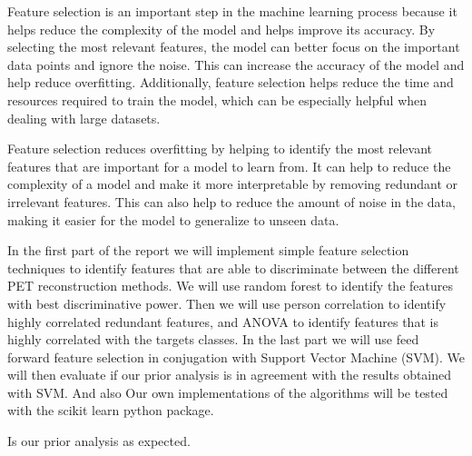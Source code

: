 Feature selection is an important step in the machine learning process because
it helps reduce the complexity of the model and helps improve its accuracy. By
selecting the most relevant features, the model can better focus on the
important data points and ignore the noise. This can increase the accuracy of
the model and help reduce overfitting. Additionally, feature selection helps
reduce the time and resources required to train the model, which can be
especially helpful when dealing with large datasets.

Feature selection reduces overfitting by helping to identify the most relevant
features that are important for a model to learn from. It can help to reduce
the complexity of a model and make it more interpretable by removing redundant
or irrelevant features. This can also help to reduce the amount of noise in the
data, making it easier for the model to generalize to unseen data.




In the first part of the report we will implement simple feature selection
techniques to identify features that are able to discriminate between the
different PET reconstruction methods. We will use random forest to identify the
features with best discriminative power. Then we will use person correlation to
identify highly correlated redundant features, and ANOVA to identify
features that is highly correlated with the targets classes. In the last part we will
use feed forward feature selection in conjugation with Support Vector Machine
(SVM). We will then evaluate if our prior analysis is in agreement with the
results obtained with SVM. And also  Our own implementations of the algorithms will be
tested with the scikit learn python package. 

Is our prior analysis as expected. 




